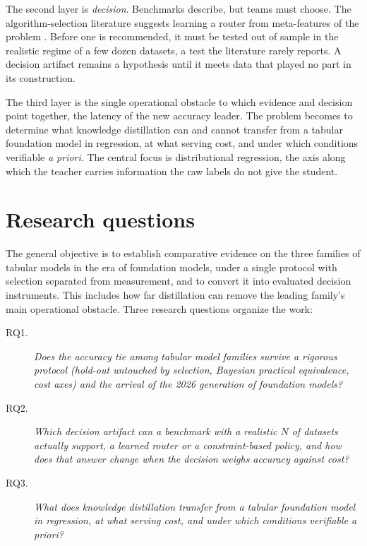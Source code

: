 The second layer is \emph{decision}. Benchmarks describe, but teams
must choose. The algorithm-selection literature suggests learning a
router from meta-features of the problem \citep{rice1976}. Before one is
recommended, it must be tested out of sample in the realistic
regime of a few dozen datasets, a test the literature rarely reports. A
decision artifact remains a hypothesis until it meets
data that played no part in its construction.

The third layer is the single operational obstacle to which evidence
and decision point together, the latency of the new accuracy
leader. The problem becomes to determine what knowledge
distillation can and cannot transfer from a tabular foundation model
in regression, at what serving cost, and under which conditions
verifiable \emph{a priori}. The central focus is distributional
regression, the axis along which the teacher carries information the raw
labels do not give the student.

\section{Research questions}
\label{sec:intro-qps}

The general objective is to establish comparative evidence on the
three families of tabular models in the era of foundation models,
under a single protocol with selection separated from measurement,
and to convert it into evaluated decision instruments. This includes
how far distillation can remove the leading family's main operational
obstacle. Three research questions organize the work:

\begin{description}
  \item[RQ1.] \emph{Does the accuracy tie among tabular model
    families survive a rigorous protocol (hold-out untouched by
    selection, Bayesian practical equivalence, cost axes) and the
    arrival of the 2026 generation of foundation models?}
  \item[RQ2.] \emph{Which decision artifact can a benchmark with a
    realistic $N$ of datasets actually support, a learned router or a
    constraint-based policy, and how does that answer change when
    the decision weighs accuracy against cost?}
  \item[RQ3.] \emph{What does knowledge distillation transfer from a
    tabular foundation model in regression, at what serving cost, and
    under which conditions verifiable a priori?}
\end{description}

